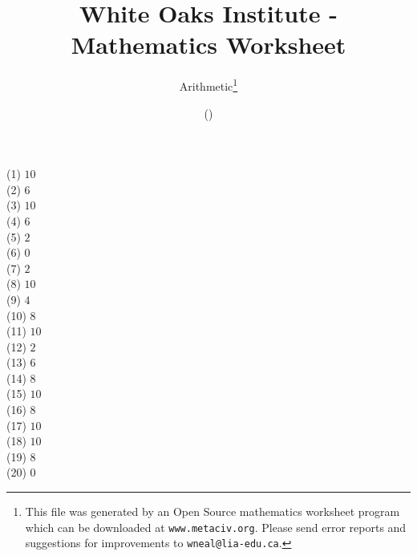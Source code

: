 \documentclass[letter]{article}
\begin{document}
\title{White Oaks Institute - Mathematics Worksheet}
\author{Arithmetic\thanks{This file was generated by an \textsf{Open Source} mathematics worksheet program which can be downloaded at \texttt{www.metaciv.org}. Please send error reports and suggestions for improvements to \texttt{wneal@lia-edu.ca}.}}
\date{\XCfileversion{} (\XCfiledate)}
\maketitle
\begin{multicols}{2}(1) $10$\\(2) $6$\\(3) $10$\\(4) $6$\\(5) $2$\\(6) $0$\\(7) $2$\\(8) $10$\\(9) $4$\\(10) $8$\\(11) $10$\\(12) $2$\\(13) $6$\\(14) $8$\\(15) $10$\\(16) $8$\\(17) $10$\\(18) $10$\\(19) $8$\\(20) $0$\end{multicols}
\end{document}
